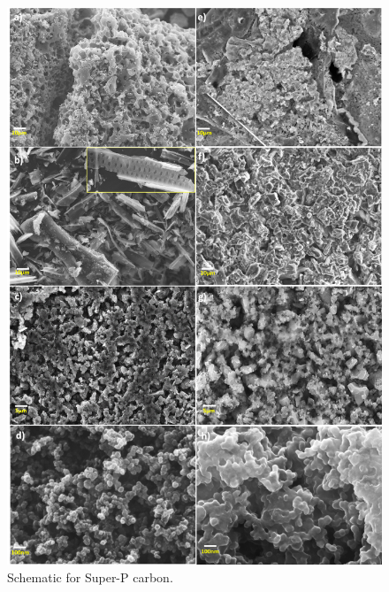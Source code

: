 \documentclass{article}
\begin{document}
\begin{figure}[h!]
  \centering
  \includegraphics[width=\textwidth]{figures/fig9}
    \caption{Schematic for Super-P carbon.}
  \label{figures:fig1}
\end{figure}
\end{document}
